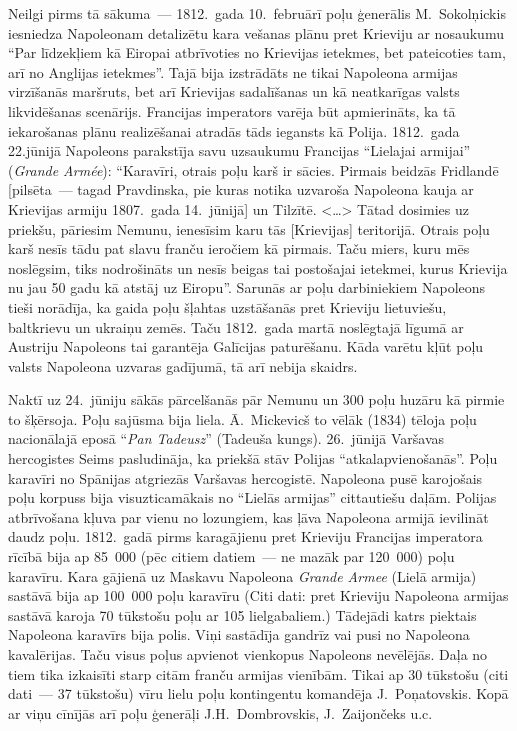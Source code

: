 \documentclass[twoside,a5paper,12pt,fleqn,openany]{extbook}
\newcommand{\pltxti}[1]{\textit{\textpolish{#1}}}
\newcommand{\frtxti}[1]{\textit{\textfrench{#1}}}
\newcommand{\citespace}{<\dots{}>}
\begin{document}
Neilgi pirms tā sākuma~--- 1812.~gada 10.~februārī poļu ģenerālis M.~Sokolņickis iesniedza Napoleonam detalizētu kara vešanas plānu pret Krieviju ar nosaukumu ``Par līdzekļiem kā Eiropai atbrīvoties no Krievijas ietekmes, bet pateicoties tam, arī no Anglijas ietekmes''. Tajā bija izstrādāts ne tikai Napoleona armijas virzīšanās maršruts, bet arī Krievijas sadalīšanas un kā neatkarīgas valsts likvidēšanas scenārijs. Francijas imperators varēja būt apmierināts, ka tā iekarošanas plānu realizēšanai atradās tāds iegansts kā Polija. 1812.~gada 22.jūnijā Napoleons parakstīja savu uzsaukumu Francijas ``Lielajai armijai'' (\frtxti{Grande Armée}): ``Karavīri, otrais poļu karš ir sācies. Pirmais beidzās Fridlandē [pilsēta~--- tagad Pravdinska, pie kuras notika uzvaroša Napoleona kauja ar Krievijas armiju 1807.~gada 14.~jūnijā] un Tilzītē. \citespace{} Tātad dosimies uz priekšu, pāriesim Nemunu, ienesīsim karu tās [Krievijas] teritorijā. Otrais poļu karš nesīs tādu pat slavu franču ieročiem kā pirmais. Taču miers, kuru mēs noslēgsim, tiks nodrošināts un nesīs beigas tai postošajai ietekmei, kurus Krievija nu jau 50 gadu kā atstāj uz Eiropu''. Sarunās ar poļu darbiniekiem Napoleons tieši norādīja, ka gaida poļu šļahtas uzstāšanās pret Krieviju lietuviešu, baltkrievu un ukraiņu zemēs. Taču 1812.~gada martā noslēgtajā līgumā ar Austriju Napoleons tai garantēja Galīcijas paturēšanu. Kāda varētu kļūt poļu valsts Napoleona uzvaras gadījumā, tā arī nebija skaidrs.

Naktī uz 24.~jūniju sākās pārcelšanās pār Nemunu un 300 poļu huzāru kā pirmie to šķērsoja. Poļu sajūsma bija liela. Ā.~Mickevicš to vēlāk (1834) tēloja poļu nacionālajā eposā ``\pltxti{Pan Tadeusz}'' (Tadeuša kungs). 26.~jūnijā Varšavas hercogistes Seims pasludināja, ka priekšā stāv Polijas ``atkalapvienošanās''. Poļu karavīri no Spānijas atgriezās Varšavas hercogistē. Napoleona pusē karojošais poļu korpuss bija visuzticamākais no ``Lielās armijas'' cittautiešu daļām. Polijas atbrīvošana kļuva par vienu no lozungiem, kas ļāva Napoleona armijā ievilināt daudz poļu. 1812.~gadā pirms karagājienu pret Krieviju Francijas imperatora rīcībā bija ap 85~000 (pēc citiem datiem~--- ne mazāk par 120~000) poļu karavīru. Kara gājienā uz Maskavu Napoleona \frtxti{Grande Armee} (Lielā armija) sastāvā bija ap 100~000 poļu karavīru (Citi dati: pret Krieviju Napoleona armijas sastāvā karoja 70 tūkstošu poļu ar 105 lielgabaliem.) Tādejādi katrs piektais Napoleona karavīrs bija polis. Viņi sastādīja gandrīz vai pusi no Napoleona kavalērijas. Taču visus poļus apvienot vienkopus Napoleons nevēlējās. Daļa no tiem tika izkaisīti starp citām franču armijas vienībām. Tikai ap 30 tūkstošu (citi dati~--- 37 tūkstošu) vīru lielu poļu kontingentu komandēja J.~Poņatovskis. Kopā ar viņu cīnījās arī poļu ģenerāļi J.H.~Dombrovskis, J.~Zaijončeks u.c.
\end{document}
